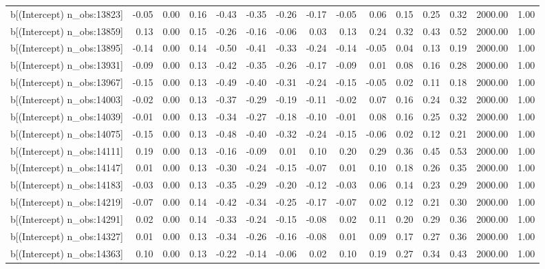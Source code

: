 \begin{table}[ht]
\begin{tabular}{rrrrrrrrrrrrrrr}
  b[(Intercept) n\_obs:13823] & -0.05 & 0.00 & 0.16 & -0.43 & -0.35 & -0.26 & -0.17 & -0.05 & 0.06 & 0.15 & 0.25 & 0.32 & 2000.00 & 1.00 \\ 
  b[(Intercept) n\_obs:13859] & 0.13 & 0.00 & 0.15 & -0.26 & -0.16 & -0.06 & 0.03 & 0.13 & 0.24 & 0.32 & 0.43 & 0.52 & 2000.00 & 1.00 \\ 
  b[(Intercept) n\_obs:13895] & -0.14 & 0.00 & 0.14 & -0.50 & -0.41 & -0.33 & -0.24 & -0.14 & -0.05 & 0.04 & 0.13 & 0.19 & 2000.00 & 1.00 \\ 
  b[(Intercept) n\_obs:13931] & -0.09 & 0.00 & 0.13 & -0.42 & -0.35 & -0.26 & -0.17 & -0.09 & 0.01 & 0.08 & 0.16 & 0.28 & 2000.00 & 1.00 \\ 
  b[(Intercept) n\_obs:13967] & -0.15 & 0.00 & 0.13 & -0.49 & -0.40 & -0.31 & -0.24 & -0.15 & -0.05 & 0.02 & 0.11 & 0.18 & 2000.00 & 1.00 \\ 
  b[(Intercept) n\_obs:14003] & -0.02 & 0.00 & 0.13 & -0.37 & -0.29 & -0.19 & -0.11 & -0.02 & 0.07 & 0.16 & 0.24 & 0.32 & 2000.00 & 1.00 \\ 
  b[(Intercept) n\_obs:14039] & -0.01 & 0.00 & 0.13 & -0.34 & -0.27 & -0.18 & -0.10 & -0.01 & 0.08 & 0.16 & 0.25 & 0.32 & 2000.00 & 1.00 \\ 
  b[(Intercept) n\_obs:14075] & -0.15 & 0.00 & 0.13 & -0.48 & -0.40 & -0.32 & -0.24 & -0.15 & -0.06 & 0.02 & 0.12 & 0.21 & 2000.00 & 1.00 \\ 
  b[(Intercept) n\_obs:14111] & 0.19 & 0.00 & 0.13 & -0.16 & -0.09 & 0.01 & 0.10 & 0.20 & 0.29 & 0.36 & 0.45 & 0.53 & 2000.00 & 1.00 \\ 
  b[(Intercept) n\_obs:14147] & 0.01 & 0.00 & 0.13 & -0.30 & -0.24 & -0.15 & -0.07 & 0.01 & 0.10 & 0.18 & 0.26 & 0.35 & 2000.00 & 1.00 \\ 
  b[(Intercept) n\_obs:14183] & -0.03 & 0.00 & 0.13 & -0.35 & -0.29 & -0.20 & -0.12 & -0.03 & 0.06 & 0.14 & 0.23 & 0.29 & 2000.00 & 1.00 \\ 
  b[(Intercept) n\_obs:14219] & -0.07 & 0.00 & 0.14 & -0.42 & -0.34 & -0.25 & -0.17 & -0.07 & 0.02 & 0.12 & 0.21 & 0.30 & 2000.00 & 1.00 \\ 
  b[(Intercept) n\_obs:14291] & 0.02 & 0.00 & 0.14 & -0.33 & -0.24 & -0.15 & -0.08 & 0.02 & 0.11 & 0.20 & 0.29 & 0.36 & 2000.00 & 1.00 \\ 
  b[(Intercept) n\_obs:14327] & 0.01 & 0.00 & 0.13 & -0.34 & -0.26 & -0.16 & -0.08 & 0.01 & 0.09 & 0.17 & 0.27 & 0.36 & 2000.00 & 1.00 \\ 
  b[(Intercept) n\_obs:14363] & 0.10 & 0.00 & 0.13 & -0.22 & -0.14 & -0.06 & 0.02 & 0.10 & 0.19 & 0.27 & 0.34 & 0.43 & 2000.00 & 1.00 \\ 

\end{tabular}
\end{table}
